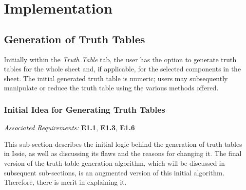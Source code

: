 \chapter{Implementation}

\section{Generation of Truth Tables}
Initially within the \textit{Truth Table} tab, the user has the option to generate truth tables for the whole sheet and, if applicable, for the selected components in the sheet. The initial generated truth table is numeric; users may subsequently manipulate or reduce the truth table using the various methods offered.
\subsection{Initial Idea for Generating Truth Tables}
\emph{Associated Requirements:} \textbf{E1.1}, \textbf{E1.3}, \textbf{E1.6}

This sub-section describes the initial logic behind the generation of truth tables in Issie, as well as discussing its flaws and the reasons for changing it. The final version of the truth table generation algorithm, which will be discussed in subsequent sub-sections, is an augmented version of this initial algorithm. Therefore, there is merit in explaining it.


